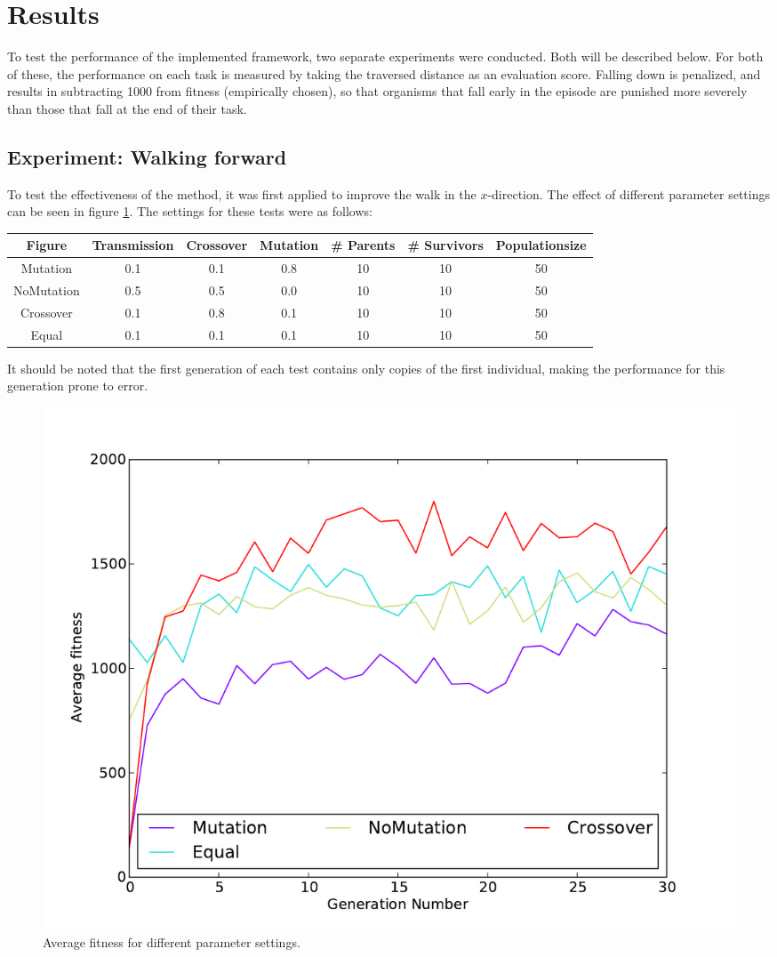 \documentclass{article}
\begin{document}
\section{Results}
To test the performance of the implemented framework, two separate experiments were conducted. Both will be described below. For both of these, the performance on each task is measured by taking the traversed distance as an evaluation score. Falling down is penalized, and results in subtracting 1000 from fitness (empirically chosen), so that organisms that fall early in the episode are punished more severely than those that fall at the end of their task.

\subsection{Experiment: Walking forward}
To test the effectiveness of the method, it was first applied to improve the walk in the $x$-direction. The effect of different parameter settings can be seen in figure \ref{fig:avgforward}. The settings for these tests were as follows:

\vspace{4mm}
\begin{tabular}{c | c          c           c           c         c             c  }
 Figure      &  Transmission & Crossover & Mutation & \# Parents & \# Survivors & Populationsize \\
 \hline
 Mutation    &  0.1              & 0.1           & 0.8          &  10  & 10  & 50  \\ 
 NoMutation  &  0.5              & 0.5           & 0.0          &  10  & 10  & 50  \\
 Crossover   &  0.1              & 0.8           & 0.1          &  10  & 10  & 50  \\
 Equal       &  0.1              & 0.1           & 0.1          &  10  & 10  & 50  \\
\end{tabular}
\vspace{4mm}

It should be noted that the first generation of each test contains only copies of the first individual, making 
the performance for this generation prone to error. 

\begin{figure}
	\center
	\includegraphics[width=.7\textwidth]{images/relevant_avg.pdf}
	\caption{Average fitness for different parameter settings.}
	\label{fig:avgforward}
\end{figure}
\end{document}
